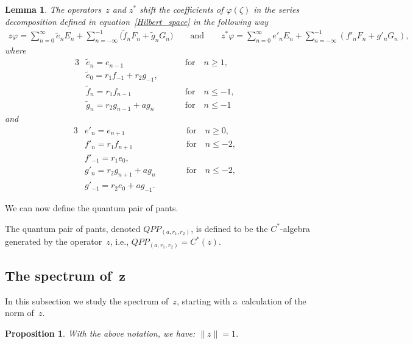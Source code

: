 \documentclass[11pt]{article}
\numberwithin{equation}{section}
\newtheorem{Lemma}[Theorem]{Lemma}
\newtheorem{Proposition}[Theorem]{Proposition}
{ \theoremstyle{definition}
\newtheorem{Definition}[Theorem]{Definition}
\newtheorem{Remark}[Theorem]{Remark} }
\begin{document}
\begin{Lemma}
\label{z_z_star_coefficients}
The operators~$z$ and $z^*$ shift the coefficients of $\varphi(\zeta)$ in the series decomposition defined in
equation~\eqref{Hilbert_space} in the following way
\begin{gather*}
z\varphi=\sum\limits_{n=0}^\infty\tilde{e}_nE_n+\sum\limits_{n=-\infty}^{-1}\!\! \big(\tilde{f}_nF_n+\tilde{g}_nG_n\big)
\qquad
\text{and}
\qquad
z^*\varphi=\sum\limits_{n=0}^\infty e'_nE_n+\sum\limits_{n=-\infty}^{-1}\!\! (f'_nF_n+g'_nG_n),
\end{gather*}
where
\begin{alignat*}{3}
& \tilde{e}_n=e_{n-1} \qquad && \text{for} \quad n\ge 1, &
\\
& \tilde{e}_0=r_1f_{-1}+r_2g_{-1}, &&&
\\
& \tilde{f}_n=r_1f_{n-1} \qquad && \text{for} \quad n\le -1,&
\\
& \tilde{g}_n=r_2g_{n-1}+ag_n \qquad && \text{for} \quad n\le -1 &
\end{alignat*}
and
\begin{alignat*}{3}
& e'_n=e_{n+1} \qquad && \text{for} \quad n\ge 0, &
\\
& f'_n=r_1f_{n+1} \qquad && \text{for} \quad n\le -2, &
\\
& f'_{-1}=r_1e_0, &&&
\\
& g'_n=r_2g_{n+1}+ag_n \qquad && \text{for} \quad n\le -2,&
\\
& g'_{-1}=r_2e_0+ag_{-1}. &&&
\end{alignat*}
\end{Lemma}
We can now def\/ine the quantum pair of pants.

\begin{Definition}
The quantum pair of pants, denoted $QPP_{(a, r_1,r_2)}$, is def\/ined to be the $C^*$-algebra generated by the
operator~$z$,
i.e., $QPP_{(a, r_1,r_2)}=C^*(z)$.
\end{Definition}

\subsection[The spectrum of~$z$]{The spectrum of~$\boldsymbol{z}$}

In this subsection we study the spectrum of~$z$, starting with a~calculation of the norm of~$z$.

\begin{Proposition}
\label{norm_of_z}
With the above notation, we have: $\|z\|=1$.
\end{Proposition}
\end{document}
